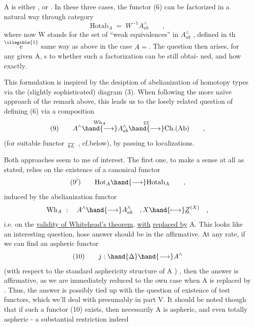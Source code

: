 
A  is either \hand{$\square$} , or  .  In these three cases,  the functor (6) can
be  factorized in a natural way through  category
\[ \mathrm{Hotab}_A \;=\; W^{-1}A^{\wedge}_{ab} \qquad , \]
where now W stands for the set of ``weak equivalences'' in  $A^{\wedge}_{ab}$ ,  defined
in th$\overset{\illegible{1}}{e}$ same way as above in the case $A=$\hand{$\Delta$}.  The question then arises,
for any given A,  s to whether such a factorization can be still obtai-%
ned,  and how exactly.

This formulation is inspired by the desiption of abelianization
of homotopy types via the (slightly sophisticated) diagram (3).  When
following the more naïve approach of the remark above,  this leads us to
the losely related question of defining (6)  via a composition
\[ (9) \qquad A^{\wedge} \overset{\mathrm{Wh}_A}{\hand{\longrightarrow}} A^{\wedge}_{ab} \overset{\over{k}{L}}{\hand{\longrightarrow}} \mathrm{Ch.(Ab)} \qquad , \]
(for suitable functor $\over{k}{L}$ , cf.below),  by passing to localizations.

Both approaches seem to me of interest.  The first one,  to make a
sense at all as stated,  relies on the existence of a canonical functor
\[ (9') \qquad \mathrm{Hot}_A \hand{\longrightarrow} \mathrm{Hotab}_A \qquad , \]
induced by the abelianization functor
\[ \mathrm{Wh}_A \ : \quad A^{\wedge} \hand{\longrightarrow} A^{\wedge}_{ab} \quad ,X \hand{\longmapsto} \underline{Z}^{(X)} \quad , \]
i.e.  on the \uline{validity of Whitehead's theorem},  \uline{with} \hand{$\Delta$} \uline{replaced by} A.
This looks like an interesting question,  hose answer should be in the
affirmative.  At any rate,  if we can find an aspheric functor
\[ (10) \qquad j: \hand{\Delta} \hand{\longrightarrow} A^{\wedge} \]
(with respect to the standard asphericity structure of A )
  ,  then the answer is affirmative,  as we are
immediately reduced to the own case when A is replaced by \hand{$\Delta$}.  Thus,
the answer is possibly tied up with the question of existence of test
functors,  which we'll deal with presumably in part V.   It should be 
noted though that if such a functor (10) exists,  then necessarily A is
aspheric,  and even totally aspheric  -  a substantial restriction indeed\unsure{!}

